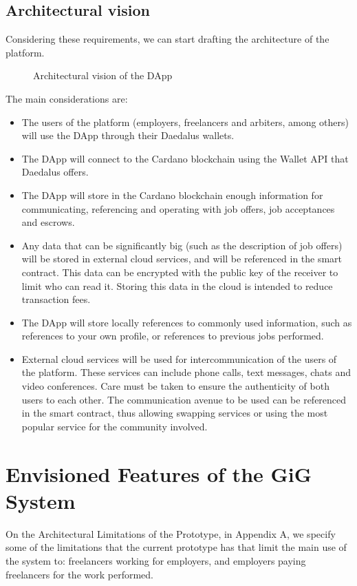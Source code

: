 \documentclass{article}
\begin{document}
\subsection{Architectural vision}

Considering these requirements, we can start drafting the architecture of the platform.

\begin{figure}[h]
  \centering{
    \large
    \resizebox{\textwidth}{!}{}
  }
  \caption{Architectural vision of the DApp} \label{fig:figureone}
\end{figure}

The main considerations are:
\begin{itemize}
  \item The users of the platform (employers, freelancers and arbiters, among others) will use the DApp through their Daedalus wallets.
  \item The DApp will connect to the Cardano blockchain using the Wallet API that Daedalus offers.
  \item The DApp will store in the Cardano blockchain enough information for communicating, referencing and operating with job offers, job acceptances and escrows.
  \item Any data that can be significantly big (such as the description of job offers) will be stored in external cloud services, and will be referenced in the smart contract. This data can be encrypted with the public key of the receiver to limit who can read it. Storing this data in the cloud is intended to reduce transaction fees.
  \item The DApp will store locally references to commonly used information, such as references to your own profile, or references to previous jobs performed.
  \item External cloud services will be used for intercommunication of the users of the platform. These services can include phone calls, text messages, chats and video conferences. Care must be taken to ensure the authenticity of both users to each other. The communication avenue to be used can be referenced in the smart contract, thus allowing swapping services or using the most popular service for the community involved.
\end{itemize}

\section{Envisioned Features of the GiG System}
On the Architectural Limitations of the Prototype, in Appendix A, we specify some of the limitations that the current prototype has that limit the main use of the system to: freelancers working for employers, and employers paying freelancers for the work performed.
\end{document}
